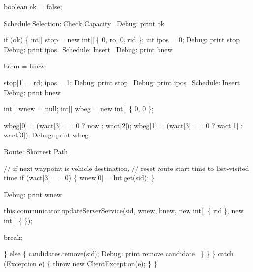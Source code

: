       boolean ok = false;

      \LA{}Schedule Selection: Check Capacity~{\nwtagstyle{}}\RA{}
      \LA{}Debug: print ok~{\nwtagstyle{}}\RA{}

      if (ok) \{
        int[] stop = new int[] \{ 0, ro, 0, rid \};
        int ipos = 0;
        \LA{}Debug: print stop~{\nwtagstyle{}}\RA{}
        \LA{}Debug: print ipos~{\nwtagstyle{}}\RA{}
        \LA{}Schedule: Insert~{\nwtagstyle{}}\RA{}
        \LA{}Debug: print bnew~{\nwtagstyle{}}\RA{}

        brem = bnew;

        stop[1] = rd;
        ipos = 1;
        \LA{}Debug: print stop~{\nwtagstyle{}}\RA{}
        \LA{}Debug: print ipos~{\nwtagstyle{}}\RA{}
        \LA{}Schedule: Insert~{\nwtagstyle{}}\RA{}
        \LA{}Debug: print bnew~{\nwtagstyle{}}\RA{}

        int[] wnew = null;
        int[] wbeg = new int[] \{ 0, 0 \};

        wbeg[0] = (wact[3] == 0 ? now : wact[2]);
        wbeg[1] = (wact[3] == 0 ? wact[1] : wact[3]);
        \LA{}Debug: print wbeg~{\nwtagstyle{}}\RA{}

        \LA{}Route: Shortest Path~{\nwtagstyle{}}\RA{}

        // if next waypoint is vehicle destination,
        // reset route start time to last-visited time
        if (wact[3] == 0) \{
          wnew[0] = lut.get(sid);
        \}

        \LA{}Debug: print wnew~{\nwtagstyle{}}\RA{}

        this.communicator.updateServerService(sid, wnew, bnew,
            new int[] \{ rid \}, new int[] \{ \});

        break;

      \} else \{
        candidates.remove(sid);
        \LA{}Debug: print remove candidate~{\nwtagstyle{}}\RA{}
      \}
    \}
  \} catch (Exception e) \{
    throw new ClientException(e);
  \}
\}
\nwendcode{}\nwdocspar

